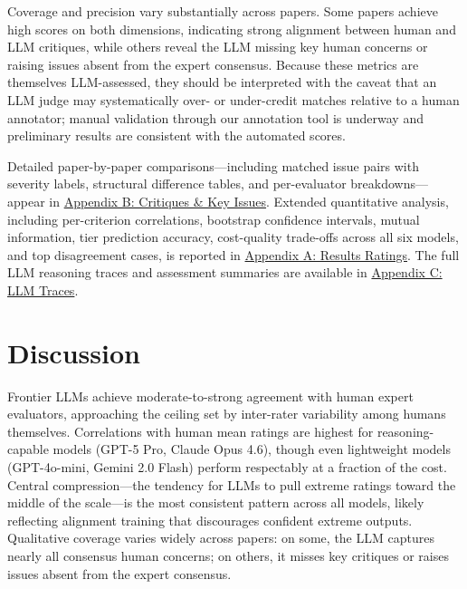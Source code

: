 \documentclass[
  11pt,
  letterpaper,
]{article}
\begin{document}
Coverage and precision vary substantially across papers. Some papers
achieve high scores on both dimensions, indicating strong alignment
between human and LLM critiques, while others reveal the LLM missing key
human concerns or raising issues absent from the expert consensus.
Because these metrics are themselves LLM-assessed, they should be
interpreted with the caveat that an LLM judge may systematically over-
or under-credit matches relative to a human annotator; manual validation
through our annotation tool is underway and preliminary results are
consistent with the automated scores.

Detailed paper-by-paper comparisons---including matched issue pairs with
severity labels, structural difference tables, and per-evaluator
breakdowns---appear in \href{results_critiques.qmd}{Appendix B:
Critiques \& Key Issues}. Extended quantitative analysis, including
per-criterion correlations, bootstrap confidence intervals, mutual
information, tier prediction accuracy, cost-quality trade-offs across
all six models, and top disagreement cases, is reported in
\href{results_ratings.qmd}{Appendix A: Results Ratings}. The full LLM
reasoning traces and assessment summaries are available in
\href{appendix_llm_traces.qmd}{Appendix C: LLM Traces}.


\section{Discussion}\label{discussion}

Frontier LLMs achieve moderate-to-strong agreement with human expert
evaluators, approaching the ceiling set by inter-rater variability among
humans themselves. Correlations with human mean ratings are highest for
reasoning-capable models (GPT-5 Pro, Claude Opus 4.6), though even
lightweight models (GPT-4o-mini, Gemini 2.0 Flash) perform respectably
at a fraction of the cost. Central compression---the tendency for LLMs
to pull extreme ratings toward the middle of the scale---is the most
consistent pattern across all models, likely reflecting alignment
training that discourages confident extreme outputs. Qualitative
coverage varies widely across papers: on some, the LLM captures nearly
all consensus human concerns; on others, it misses key critiques or
raises issues absent from the expert consensus.
\end{document}
